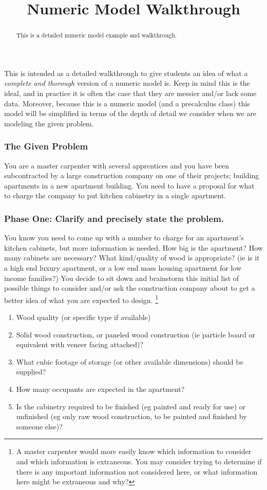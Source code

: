 \documentclass{ximeraXloud}
\title{Numeric Model Walkthrough}
\begin{document}
\begin{abstract}
    This is a detailed numeric model example and walkthrough.
\end{abstract}
\maketitle


This is intended as a detailed walkthrough to give students an idea of what a \textit{complete and thorough} version of a numeric model is. Keep in mind this is the ideal, and in practice it is often the case that they are messier and/or lack some data. Moreover, because this is a numeric model (and a precalculus class) this model will be simplified in terms of the depth of detail we consider when we are modeling the given problem.

\subsubsection*{The Given Problem}
    You are a master carpenter with several apprentices and you have been subcontracted by a large construction company on one of their projects; building apartments in a new apartment building. You need to have a proposal for what to charge the company to put kitchen cabinetry in a single apartment.

\subsubsection*{Phase One: Clarify and precisely state the problem.}
    You know you need to come up with a number to charge for an apartment's kitchen cabinets, but more information is needed. How big is the apartment? How many cabinets are necessary? What kind/quality of wood is appropriate? (ie is it a high end luxury apartment, or a low end mass housing apartment for low income families?) You decide to sit down and brainstorm this initial list of possible things to consider and/or ask the construction company about to get a better idea of what you are expected to design.
    \footnote{A master carpenter would more easily know which information to consider and which information is extraneous. You may consider trying to determine if there is any important information not considered here, or what information here might be extraneous and why?}
    \begin{enumerate}
        \item Wood quality (or specific type if available)
        \item Solid wood construction, or paneled wood construction (ie particle board or equivalent with veneer facing attached)?
        \item What cubic footage of storage (or other available dimensions) should be supplied?
        \item How many occupants are expected in the apartment?
        \item Is the cabinetry required to be finished (eg painted and ready for use) or unfinished (eg only raw wood construction, to be painted and finished by someone else)?
    \end{enumerate}
    
\end{document}
